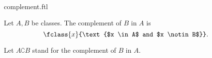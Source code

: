 \documentclass{article}
\begin{document}
\begin{smodule}[creators={Marcel Schütz}]{complement.ftl}


  \begin{fdefinition*}[label=7620345041256448]
    Let $A, B$ be classes.
    The complement of $B$ in $A$ is
    \[\fclass{x}{\text{$x \in A$ and $x \notin B$}}.\]
  \end{fdefinition*}

  \begin{fconvention*}
    Let $A \complement B$ stand for the complement of $B$ in $A$.
  \end{fconvention*}
\end{smodule}
\end{document}
